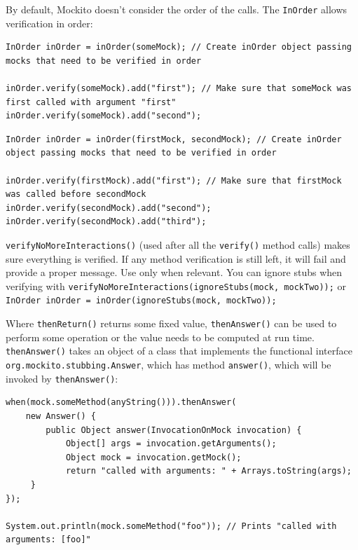 \documentclass[table, xcdraw]{article}%
\begin{document}
By default, Mockito doesn't consider the order of the calls. The \texttt{InOrder} allows verification in order:

\begin{verbatim}
InOrder inOrder = inOrder(someMock); // Create inOrder object passing mocks that need to be verified in order

inOrder.verify(someMock).add("first"); // Make sure that someMock was first called with argument "first"
inOrder.verify(someMock).add("second");
\end{verbatim}

\begin{verbatim}
InOrder inOrder = inOrder(firstMock, secondMock); // Create inOrder object passing mocks that need to be verified in order

inOrder.verify(firstMock).add("first"); // Make sure that firstMock was called before secondMock
inOrder.verify(secondMock).add("second");
inOrder.verify(secondMock).add("third");
\end{verbatim}

\texttt{verifyNoMoreInteractions()} (used after all the \texttt{verify()} method calls) makes sure everything is verified. If any method verification is still left, it will fail and provide a proper message. Use only when relevant. You can ignore stubs when verifying with \texttt{verifyNoMoreInteractions(ignoreStubs(mock, mockTwo));} or \texttt{InOrder inOrder = inOrder(ignoreStubs(mock, mockTwo));}

Where \texttt{thenReturn()} returns some fixed value, \texttt{thenAnswer()} can be used to perform some operation or the value needs to be computed at run time. \texttt{thenAnswer()} takes an object of a class that implements the functional interface \texttt{org.mockito.stubbing.Answer}, which has method \texttt{answer()}, which will be invoked by \texttt{thenAnswer()}:

\begin{verbatim}
when(mock.someMethod(anyString())).thenAnswer(
    new Answer() {
        public Object answer(InvocationOnMock invocation) {
            Object[] args = invocation.getArguments();
            Object mock = invocation.getMock();
            return "called with arguments: " + Arrays.toString(args);
     }
});

System.out.println(mock.someMethod("foo")); // Prints "called with arguments: [foo]"
\end{verbatim}
\end{document}
